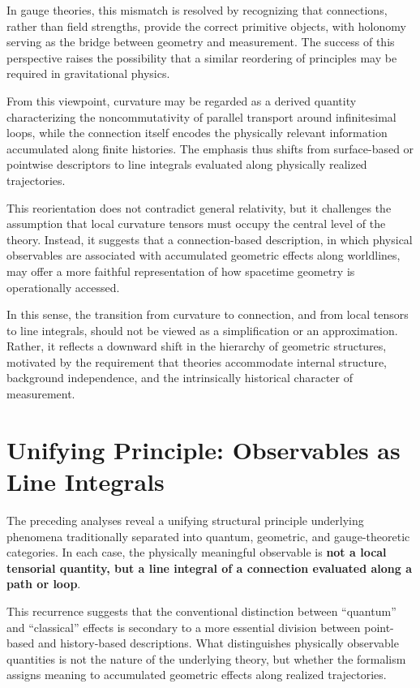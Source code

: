 \documentclass[%
 reprint,
 amsmath,amssymb,
 aps,
 prb,
]{revtex4-2}
\numberwithin{equation}{section}
\begin{document}
In gauge theories, this mismatch is resolved by recognizing that connections, rather than field strengths, provide the correct primitive objects, with holonomy serving as the bridge between geometry and measurement. The success of this perspective raises the possibility that a similar reordering of principles may be required in gravitational physics.

From this viewpoint, curvature may be regarded as a derived quantity characterizing the noncommutativity of parallel transport around infinitesimal loops, while the connection itself encodes the physically relevant information accumulated along finite histories. The emphasis thus shifts from surface-based or pointwise descriptors to line integrals evaluated along physically realized trajectories.

This reorientation does not contradict general relativity, but it challenges the assumption that local curvature tensors must occupy the central level of the theory. Instead, it suggests that a connection-based description, in which physical observables are associated with accumulated geometric effects along worldlines, may offer a more faithful representation of how spacetime geometry is operationally accessed.

In this sense, the transition from curvature to connection, and from local tensors to line integrals, should not be viewed as a simplification or an approximation. Rather, it reflects a downward shift in the hierarchy of geometric structures, motivated by the requirement that theories accommodate internal structure, background independence, and the intrinsically historical character of measurement.


\section{Unifying Principle: Observables as Line Integrals}
\label{sec:unifying_line_integral_principle}

The preceding analyses reveal a unifying structural principle underlying phenomena traditionally separated into quantum, geometric, and gauge-theoretic categories. In each case, the physically meaningful observable is \textbf{not a local tensorial quantity, but a line integral of a connection evaluated along a path or loop}.

This recurrence suggests that the conventional distinction between ``quantum'' and ``classical'' effects is secondary to a more essential division between point-based and history-based descriptions. What distinguishes physically observable quantities is not the nature of the underlying theory, but whether the formalism assigns meaning to accumulated geometric effects along realized trajectories.
\end{document}
